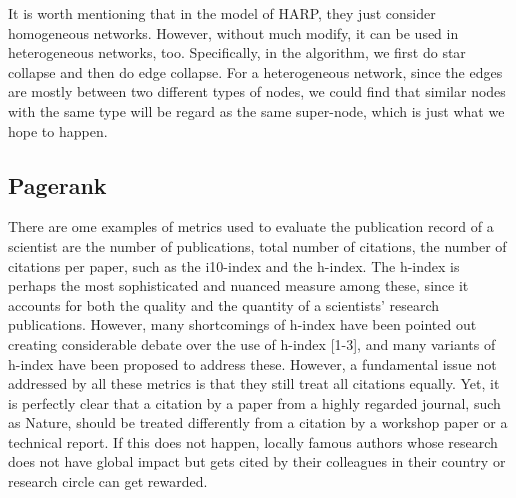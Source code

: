 \documentclass[conference]{IEEEtran}
\begin{document}
It is worth mentioning that in the model of HARP, they just consider homogeneous networks. However, without much modify, it can be used in heterogeneous networks, too. Specifically, in the algorithm, we first do star collapse and then do edge collapse. For a heterogeneous network, since the edges are mostly between two different types of nodes, we could find that similar nodes with the same type will be regard as the same super-node, which is just what we hope to happen.
\subsection{Pagerank}
There are ome examples of metrics used to evaluate the publication record of a scientist are the number of publications, total number of citations, the number of citations per paper, such as the i10-index and the h-index. The h-index is perhaps the most sophisticated and nuanced measure among these, since it accounts for both the quality and the quantity of a scientists’ research publications. However, many shortcomings of h-index have been pointed out creating considerable debate over the use of h-index [1-3], and many variants of h-index have been proposed to address these. However, a fundamental issue not addressed by all these metrics is that they still treat all citations equally. Yet, it is perfectly clear that a citation by a paper from a highly regarded journal, such as Nature, should be treated differently from a citation by a workshop paper or a technical report. If this does not happen, locally famous authors whose research does not have global impact but gets cited by their colleagues in their country or research circle can get rewarded. 
\end{document}
